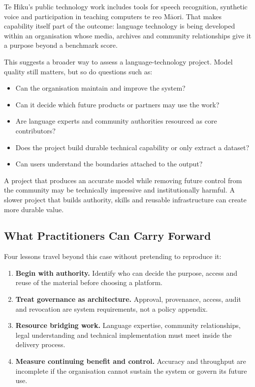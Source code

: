 Te Hiku's public technology work includes tools for speech recognition, synthetic voice and participation in teaching computers te reo Māori. That makes capability itself part of the outcome: language technology is being developed within an organisation whose media, archives and community relationships give it a purpose beyond a benchmark score. \autocite{te-hiku-tech}


This suggests a broader way to assess a language-technology project. Model quality still matters, but so do questions such as:


\begin{itemize}[leftmargin=*]
\item Can the organisation maintain and improve the system?
\item Can it decide which future products or partners may use the work?
\item Are language experts and community authorities resourced as core contributors?
\item Does the project build durable technical capability or only extract a dataset?
\item Can users understand the boundaries attached to the output?
\end{itemize}

A project that produces an accurate model while removing future control from the community may be technically impressive and institutionally harmful. A slower project that builds authority, skills and reusable infrastructure can create more durable value.



\subsection{What Practitioners Can Carry Forward}


Four lessons travel beyond this case without pretending to reproduce it:


\begin{enumerate}[leftmargin=*]
\item \textbf{Begin with authority.} Identify who can decide the purpose, access and reuse of the material before choosing a platform.
\item \textbf{Treat governance as architecture.} Approval, provenance, access, audit and revocation are system requirements, not a policy appendix.
\item \textbf{Resource bridging work.} Language expertise, community relationships, legal understanding and technical implementation must meet inside the delivery process.
\item \textbf{Measure continuing benefit and control.} Accuracy and throughput are incomplete if the organisation cannot sustain the system or govern its future use.
\end{enumerate}

